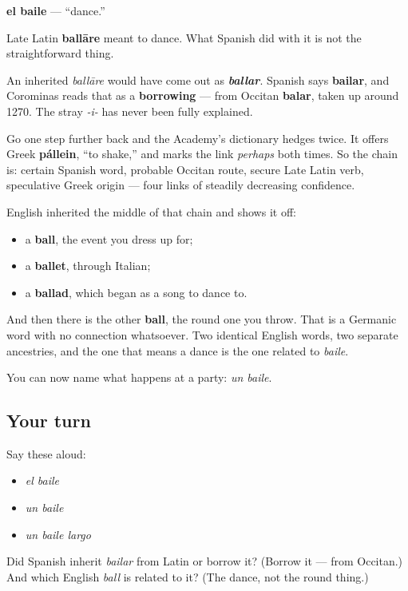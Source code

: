 \begin{cousinweb}
\textbf{el baile} — \textquotedblleft{}dance.\textquotedblright{}

Late Latin \textbf{ballāre} meant to dance. What Spanish did with it is not the straightforward thing.

An inherited \emph{ballāre} would have come out as \emph{\textbf{ballar}}. Spanish says \textbf{bailar}, and Corominas reads that as a \textbf{borrowing} — from Occitan \textbf{balar}, taken up around 1270. The stray \emph{-i-} has never been fully explained.

Go one step further back and the Academy's dictionary hedges twice. It offers Greek \textbf{pállein}, \textquotedblleft{}to shake,\textquotedblright{} and marks the link \emph{perhaps} both times. So the chain is: certain Spanish word, probable Occitan route, secure Late Latin verb, speculative Greek origin — four links of steadily decreasing confidence.

English inherited the middle of that chain and shows it off:

\begin{itemize}
\raggedright
  \item a \textbf{ball}, the event you dress up for;
  \item a \textbf{ballet}, through Italian;
  \item a \textbf{ballad}, which began as a song to dance to.
\end{itemize}

And then there is the other \textbf{ball}, the round one you throw. That is a Germanic word with no connection whatsoever. Two identical English words, two separate ancestries, and the one that means a dance is the one related to \emph{baile}.
\end{cousinweb}

\begin{grammarlens}[title={What you've built}]
You can now name what happens at a party: \emph{un baile}.
\end{grammarlens}

\subsection*{Your turn}
Say these aloud:

\begin{itemize}
\raggedright
  \item \emph{el baile}
  \item \emph{un baile}
  \item \emph{un baile largo}
\end{itemize}

\begin{tcolorbox}[breakable,colback=teal!4,colframe=teal!35!black,title={Before you move on}]
Did Spanish inherit \emph{bailar} from Latin or borrow it? (Borrow it — from Occitan.) And which English \emph{ball} is related to it? (The dance, not the round thing.)
\end{tcolorbox}
